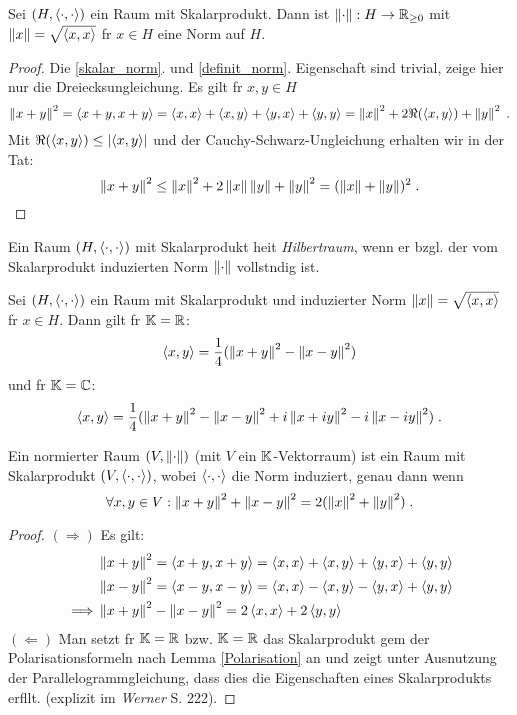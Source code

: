 \begin{theorem}
	Sei \((H, \ip{\cdot,\cdot})\) ein Raum mit Skalarprodukt. Dann ist \(\norm\cdot : H \to \R_{\geq 0} \) mit \( \norm x = \sqrt{\ip{x,x}}\) f\us r \(x \in H\) eine Norm auf $H$.
	\label{NormSP}
\end{theorem}
\begin{proof}
	Die \ref{skalar_norm}. und \ref{definit_norm}. Eigenschaft sind trivial, zeige hier nur die Dreiecksungleichung. Es gilt f\us r \(x,y \in H\)
	\[\norm{x+y}^2 = \ip{x+y, x+y} = \ip{x,x} + \ip{x,y} + \ip{y,x} + \ip{y,y} = \norm{x}^2 + 2 \Re(\ip{x,y}) + \norm{y}^2 \;.
	\]
	Mit \(\Re(\ip{x,y}) \leq \ab{\ip{x,y}}\) und der Cauchy-Schwarz-Ungleichung erhalten wir in der Tat:
	\[\norm{x+y}^2 \leq \norm{x}^2 + 2 \norm x \norm y + \norm{y}^2 = (\norm x + \norm y)^2 \;.\]
\end{proof}

\begin{definition}
  Ein Raum \((H, \ip{\cdot, \cdot})\) mit Skalarprodukt hei\s t \textit{Hilbertraum}, wenn er bzgl. der vom Skalarprodukt induzierten Norm \(\norm \cdot\) vollst\as ndig ist.
\end{definition}

\begin{lemma}[Polarisationsformel]
	Sei \((H, \ip{\cdot, \cdot})\) ein Raum mit Skalarprodukt und induzierter Norm \(\norm x = \sqrt{\ip{x,x}}\) f\us r \(x \in H\). Dann gilt f\us r \(\K = \R\): 
	\[\ip{x,y} = \frac{1}{4} (\norm{x+y}^2 - \norm{x-y}^2)\]
	und f\us r \(\K = \C\):
	\[\ip{x,y} = \frac{1}{4}(\norm{x+y}^2 - \norm{x-y}^2 + i\norm{x+iy}^2 - i\norm{x-iy}^2)\;.\]
	\label{Polarisation}
\end{lemma}

\begin{theorem}[Parallelogrammgleichung]
	Ein normierter Raum \((V, \norm \cdot)\) (mit $V$ ein $\K$-Vektorraum) ist ein Raum mit Skalarprodukt \((V, \ip{\cdot, \cdot})\), wobei \(\ip{\cdot, \cdot}\) die Norm induziert, genau dann wenn 
	\[\forall x, y \in V: \norm{x+y}^2 + \norm{x-y}^2 = 2(\norm{x}^2 + \norm{y}^2)\;.\]
\end{theorem}
\begin{proof}
	\((\Longrightarrow)\) Es gilt: 
	\begin{align*}
		& \norm{x+y}^2 = \ip{x+y, x+y} = \ip{x,x} + \ip{x,y} + \ip{y,x} + \ip{y,y}\\
		& \norm{x-y}^2 = \ip{x-y, x-y} = \ip{x,x} - \ip{x,y} - \ip{y,x} + \ip{y,y}\\
		\implies & \norm{x+y}^2 -  \norm{x-y}^2  = 2 \ip{x,x} +  2 \ip{y,y}
	\end{align*}
	\((\Longleftarrow)\) Man setzt f\us r \(\K = \R \) bzw. \(\K = \R\) das Skalarprodukt gem\as \s{} der Polarisationsformeln nach Lemma \ref{Polarisation} an und zeigt unter Ausnutzung der Parallelogrammgleichung, dass dies die Eigenschaften eines Skalarprodukts erf\us llt. (explizit im \textit{Werner} S. 222).
\end{proof}

